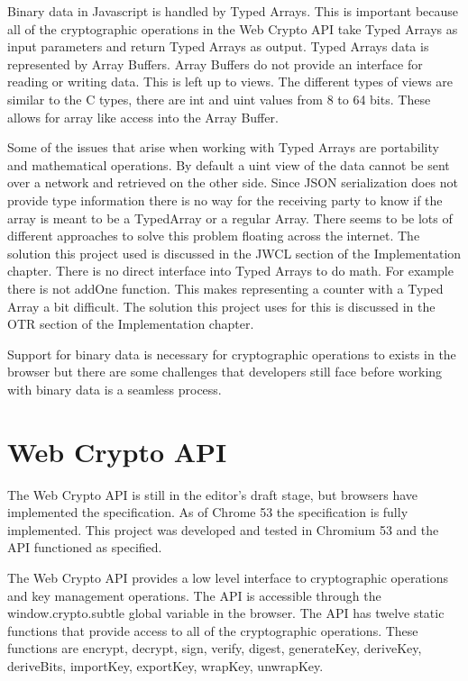 Binary data in Javascript is handled by Typed Arrays. This is important because all of the cryptographic operations in the Web Crypto API take Typed Arrays as input parameters and return Typed Arrays as output. Typed Arrays data is represented by Array Buffers. Array Buffers do not provide an interface for reading or writing data. This is left up to views. The different types of views are similar to the C types, there are int and uint values from 8 to 64 bits. These allows for array like access into the Array Buffer.\cite{mdn-typedarrays}


Some of the issues that arise when working with Typed Arrays are portability and mathematical operations. By default a uint view of the data cannot be sent over a network and retrieved on the other side. Since JSON serialization does not provide type information there is no way for the receiving party to know if the array is meant to be a TypedArray or a regular Array. There seems to be lots of different approaches to solve this problem floating across the internet. The solution this project used is discussed in the JWCL section of the Implementation chapter. There is no direct interface into Typed Arrays to do math. For example there is not addOne function. This makes representing a counter with a Typed Array a bit difficult. The solution this project uses for this is discussed in the OTR section of the Implementation chapter.


Support for binary data is necessary for cryptographic operations to exists in the browser but there are some challenges that developers still face before working with binary data is a seamless process.


\section{Web Crypto API}


The Web Crypto API is still in the editor's draft stage, but browsers have implemented the specification. As of Chrome 53 the specification is fully implemented. This project was developed and tested in Chromium 53 and the API functioned as specified.\cite{webcrypto-overview}\cite{webcrypto-chromium}


The Web Crypto API provides a low level interface to cryptographic operations and key management operations. The API is accessible through the window.crypto.subtle global variable in the browser. The API has twelve static functions that provide access to all of the cryptographic operations. These functions are encrypt, decrypt, sign, verify, digest, generateKey, deriveKey, deriveBits, importKey, exportKey, wrapKey, unwrapKey.


